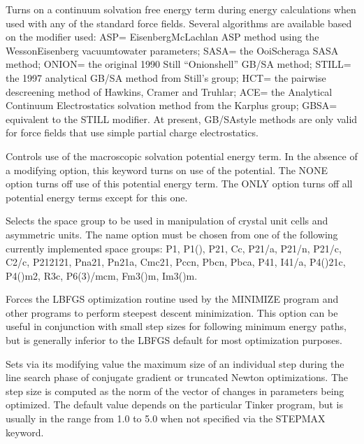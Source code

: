 \documentclass[letterpaper,11pt,english]{sphinxmanual}
\begin{document}
  Turns on a continuum solvation free energy term during energy calculations when used with any of the standard force fields. Several algorithms are available based on the modifier used: ASP= Eisenberg\sphinxhyphen{}McLachlan ASP method using the Wesson\sphinxhyphen{}Eisenberg vacuum\sphinxhyphen{}to\sphinxhyphen{}water parameters; SASA= the Ooi\sphinxhyphen{}Scheraga SASA method; ONION= the original 1990 Still “Onion\sphinxhyphen{}shell” GB/SA method; STILL= the 1997 analytical GB/SA method from Still’s group; HCT= the pairwise descreening method of Hawkins, Cramer and Truhlar; ACE= the Analytical Continuum Electrostatics solvation method from the Karplus group; GBSA= equivalent to the STILL modifier. At present, GB/SA\sphinxhyphen{}style methods are only valid for force fields that use simple partial charge electrostatics.

  Controls use of the macroscopic solvation potential energy term. In the absence of a modifying option, this keyword turns on use of the potential. The NONE option turns off use of this potential energy term. The ONLY option turns off all potential energy terms except for this one.


  Selects the space group to be used in manipulation of crystal unit cells and asymmetric units. The name option must be chosen from one of the following currently implemented space groups: P1, P1(\sphinxhyphen{}), P21, Cc, P21/a, P21/n, P21/c, C2/c, P212121, Pna21, Pn21a, Cmc21, Pccn, Pbcn, Pbca, P41, I41/a, P4(\sphinxhyphen{})21c, P4(\sphinxhyphen{})m2, R3c, P6(3)/mcm, Fm3(\sphinxhyphen{})m, Im3(\sphinxhyphen{})m.



  Forces the L\sphinxhyphen{}BFGS optimization routine used by the MINIMIZE program and other programs to perform steepest descent minimization. This option can be useful in conjunction with small step sizes for following minimum energy paths, but is generally inferior to the L\sphinxhyphen{}BFGS default for most optimization purposes.

  Sets via its modifying value the maximum size of an individual step during the line search phase of conjugate gradient or truncated Newton optimizations. The step size is computed as the norm of the vector of changes in parameters being optimized. The default value depends on the particular Tinker program, but is usually in the range from 1.0 to 5.0 when not specified via the STEPMAX keyword.
\end{document}
